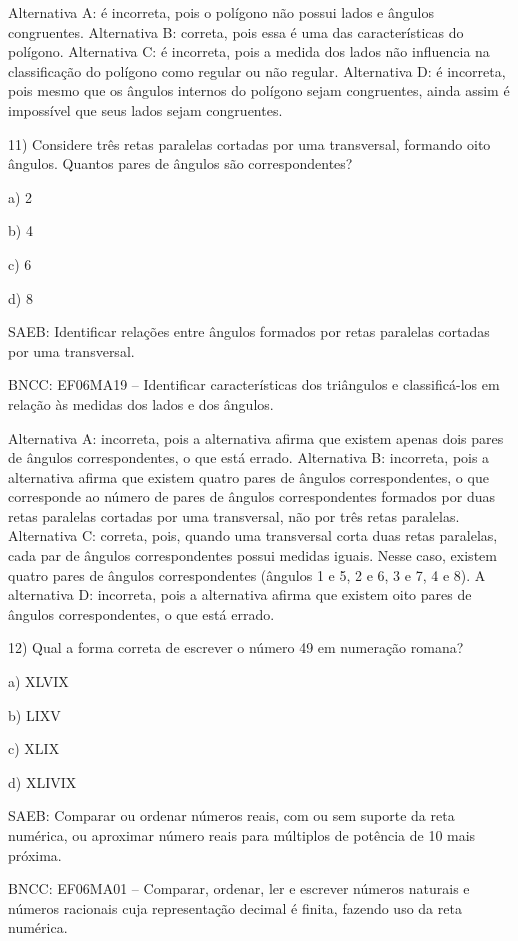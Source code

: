 Alternativa A: é incorreta, pois o polígono não possui lados e ângulos
congruentes. Alternativa B: correta, pois essa é uma das características
do polígono. Alternativa C: é incorreta, pois a medida dos lados não
influencia na classificação do polígono como regular ou não regular.
Alternativa D: é incorreta, pois mesmo que os ângulos internos do
polígono sejam congruentes, ainda assim é impossível que seus lados
sejam congruentes.

11) Considere três retas paralelas cortadas por uma transversal,
formando oito ângulos. Quantos pares de ângulos são correspondentes?

a) 2

b) 4

c) 6

d) 8

SAEB: Identificar relações entre ângulos formados por retas paralelas
cortadas por uma transversal.

BNCC: EF06MA19 -- Identificar características dos triângulos e
classificá-los em relação às medidas dos lados e dos ângulos.

Alternativa A: incorreta, pois a alternativa afirma que existem apenas
dois pares de ângulos correspondentes, o que está errado. Alternativa B:
incorreta, pois a alternativa afirma que existem quatro pares de ângulos
correspondentes, o que corresponde ao número de pares de ângulos
correspondentes formados por duas retas paralelas cortadas por uma
transversal, não por três retas paralelas. Alternativa C: correta, pois,
quando uma transversal corta duas retas paralelas, cada par de ângulos
correspondentes possui medidas iguais. Nesse caso, existem quatro pares
de ângulos correspondentes (ângulos 1 e 5, 2 e 6, 3 e 7, 4 e 8). A
alternativa D: incorreta, pois a alternativa afirma que existem oito
pares de ângulos correspondentes, o que está errado.

12) Qual a forma correta de escrever o número 49 em numeração romana?

a) XLVIX

b) LIXV

c) XLIX

d) XLIVIX

SAEB: Comparar ou ordenar números reais, com ou sem suporte da reta
numérica, ou aproximar número reais para múltiplos de potência de 10
mais próxima.

BNCC: EF06MA01 -- Comparar, ordenar, ler e escrever números naturais e
números racionais cuja representação decimal é finita, fazendo uso da
reta numérica.

